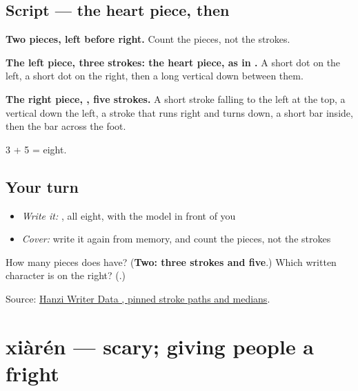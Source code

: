 \subsection*{Script — the heart piece, then }

\begin{quote}
\end{quote}

\textbf{Two pieces, left before right.} Count the pieces, not the strokes.

\textbf{The left piece, three strokes: the heart piece, as in .} A short dot on the left, a short dot on the right, then a long vertical down between them.

\textbf{The right piece, , five strokes.} A short stroke falling to the left at the top, a vertical down the left, a stroke that runs right and turns down, a short bar inside, then the bar across the foot.

3 + 5 = eight.

\subsection*{Your turn}
\begin{itemize}
\raggedright
  \item \emph{Write it:} , all eight, with the model in front of you
  \item \emph{Cover:} write it again from memory, and count the pieces, not the strokes
\end{itemize}

\begin{tcolorbox}[breakable,colback=teal!4,colframe=teal!35!black,title={Before you move on}]
How many pieces does  have? (\textbf{Two: three strokes and five}.) Which written character is on the right? (\textbf{}.)

Source: \href{https://raw.githubusercontent.com/chanind/hanzi-writer-data/68d10a4b21150cae5e1ebbd223eed289cf32d90c/data/\%E6\%80\%95.json}{Hanzi Writer Data , pinned stroke paths and medians}.
\end{tcolorbox}
\section[xiàrén]{xiàrén — scary; giving people a fright}

\label{lesson:ZH-C463-xiaren}



